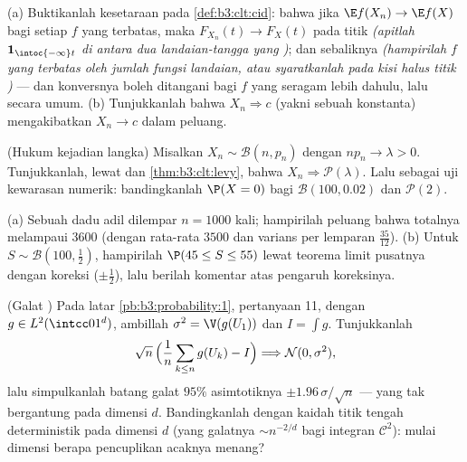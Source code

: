 \begin{exercise}[$\star\star$]\label{exo:b3:clt:4}
(a) Buktikanlah kesetaraan pada \cref{def:b3:clt:cid}: bahwa jika
$\E f(X_n) \to \E f(X)$ bagi setiap $f$ yang  terbatas,
maka $F_{X_n}(t) \to F_X(t)$ pada titik 
\emph{(apitlah $\mathbf 1_{\intoc{-\infty}t}$ di antara dua
landaian-tangga yang )}; dan sebaliknya
\emph{(hampirilah $f$ yang  terbatas oleh jumlah fungsi
landaian, atau syaratkanlah pada kisi halus titik
)} --- dan konversnya boleh ditangani bagi $f$ yang 
seragam lebih dahulu, lalu secara umum.
(b) Tunjukkanlah bahwa $X_n \Rightarrow c$ (yakni sebuah konstanta) mengakibatkan $X_n
\to c$ dalam peluang.
\end{exercise}

\begin{exercise}[$\star\star$]\label{exo:b3:clt:5}
(Hukum kejadian langka) Misalkan $X_n \sim \mathcal B(n, p_n)$ dengan
$np_n \to \lambda > 0$. Tunjukkanlah, lewat 
dan \cref{thm:b3:clt:levy}, bahwa $X_n \Rightarrow \mathcal
P(\lambda)$. Lalu sebagai uji kewarasan numerik: bandingkanlah $\P(X = 0)$ bagi
$\mathcal B(100, 0.02)$ dan $\mathcal P(2)$.
\end{exercise}

\begin{exercise}[$\star\star$]\label{exo:b3:clt:6}
(a) Sebuah dadu adil dilempar $n = 1000$ kali; hampirilah
peluang bahwa totalnya melampaui $3600$ (dengan rata-rata $3500$ dan
varians per lemparan $\frac{35}{12}$).
(b) Untuk $S \sim \mathcal B(100, \frac12)$, hampirilah
$\P(45 \leq S \leq 55)$ lewat teorema limit pusatnya dengan koreksi
 ($\pm\frac12$), lalu berilah komentar atas pengaruh
koreksinya.
\end{exercise}

\begin{exercise}[$\star\star$]\label{exo:b3:clt:7}
(Galat ) Pada latar
\cref{pb:b3:probability:1}, pertanyaan 11, dengan $g \in
L^2(\intcc01^d)$, ambillah $\sigma^2 = \V(g(U_1))$ dan $I = \int
g$. Tunjukkanlah
\[
\sqrt n\,\Bigl(\frac1n\sum_{k\leq n}g(U_k) - I\Bigr)
\Longrightarrow \mathcal N(0, \sigma^2),
\]
lalu simpulkanlah batang galat $95\%$ asimtotiknya $\pm
1.96\,\sigma/\sqrt n$ --- yang tak bergantung pada dimensi $d$.
Bandingkanlah dengan kaidah titik tengah deterministik pada dimensi
$d$ (yang galatnya $\sim n^{-2/d}$ bagi integran $\mathcal C^2$):
mulai dimensi berapa pencuplikan acaknya menang?
\end{exercise}

